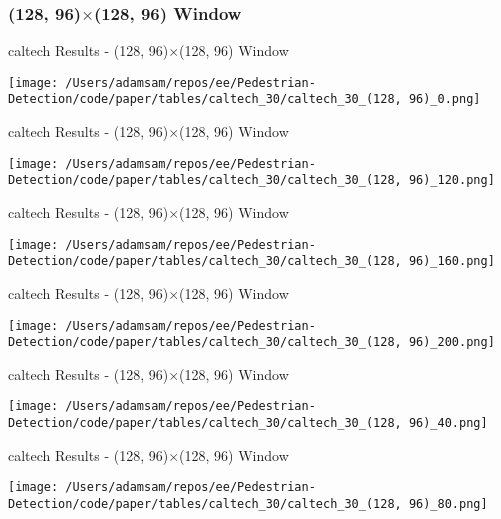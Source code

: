 \subsubsection*{(128, 96)$\times$(128, 96) Window}

\begin{table}
    \caption{caltech Results - (128, 96)$\times$(128, 96) Window}
    \texttt{[image: /Users/adamsam/repos/ee/Pedestrian-Detection/code/paper/tables/caltech\_30/caltech\_30\_(128, 96)\_0.png]}
    \label{tab:caltech_30_(128, 96)_0}
\end{table}

\begin{table}
    \caption{caltech Results - (128, 96)$\times$(128, 96) Window}
    \texttt{[image: /Users/adamsam/repos/ee/Pedestrian-Detection/code/paper/tables/caltech\_30/caltech\_30\_(128, 96)\_120.png]}
    \label{tab:caltech_30_(128, 96)_120}
\end{table}

\begin{table}
    \caption{caltech Results - (128, 96)$\times$(128, 96) Window}
    \texttt{[image: /Users/adamsam/repos/ee/Pedestrian-Detection/code/paper/tables/caltech\_30/caltech\_30\_(128, 96)\_160.png]}
    \label{tab:caltech_30_(128, 96)_160}
\end{table}

\begin{table}
    \caption{caltech Results - (128, 96)$\times$(128, 96) Window}
    \texttt{[image: /Users/adamsam/repos/ee/Pedestrian-Detection/code/paper/tables/caltech\_30/caltech\_30\_(128, 96)\_200.png]}
    \label{tab:caltech_30_(128, 96)_200}
\end{table}

\begin{table}
    \caption{caltech Results - (128, 96)$\times$(128, 96) Window}
    \texttt{[image: /Users/adamsam/repos/ee/Pedestrian-Detection/code/paper/tables/caltech\_30/caltech\_30\_(128, 96)\_40.png]}
    \label{tab:caltech_30_(128, 96)_40}
\end{table}

\begin{table}
    \caption{caltech Results - (128, 96)$\times$(128, 96) Window}
    \texttt{[image: /Users/adamsam/repos/ee/Pedestrian-Detection/code/paper/tables/caltech\_30/caltech\_30\_(128, 96)\_80.png]}
    \label{tab:caltech_30_(128, 96)_80}
\end{table}
